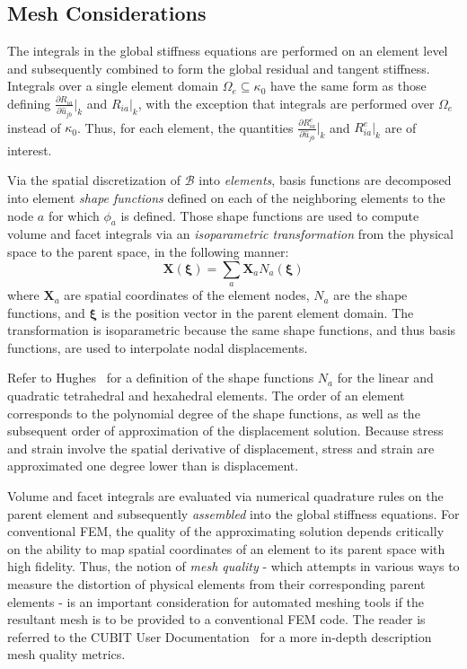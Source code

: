 \subsection{Mesh Considerations}

The integrals in the global stiffness equations are performed on an element level and subsequently combined to form the global residual and tangent stiffness. Integrals over a single element domain $\Omega_e \subseteq \kappa_0$ have the same form as those defining $\frac{\partial R_{ia}}{\partial \hat{u}_{jb}} \big|_k$ and $R_{ia}\big|_k$, with the exception that integrals are performed over $\Omega_e$ instead of $\kappa_0$. Thus, for each element, the quantities $\frac{\partial R^e_{ia}}{\partial \hat{u}_{jb}} \big|_k$ and $R^e_{ia}\big|_k$ are of interest.

Via the spatial discretization of $\mathcal{B}$ into \textit{elements}, basis functions are decomposed into element \textit{shape functions} defined on each of the neighboring elements to the node $a$ for which $\phi_a$ is defined. Those shape functions are used to compute volume and facet integrals via an \textit{isoparametric transformation} from the physical space to the parent space, in the following manner:
\begin{equation}
\bm{X}(\bm{\xi}) = \sum\limits_{a}\bm{X}_a{N}_a(\bm{\xi})
\end{equation}
where $\bm{X}_a$ are spatial coordinates of the element nodes, $N_a$ are the shape functions, and $\bm{\xi}$ is the position vector in the parent element domain. The transformation is isoparametric because the same shape functions, and thus basis functions, are used to interpolate nodal displacements. 

Refer to Hughes~\cite{hughes_2007} for a definition of the shape functions $N_a$ for the linear and quadratic tetrahedral and hexahedral elements. The order of an element corresponds to the polynomial degree of the shape functions, as well as the subsequent order of approximation of the displacement solution. Because stress and strain involve the spatial derivative of displacement, stress and strain are approximated one degree lower than is displacement. 

Volume and facet integrals are evaluated via numerical quadrature rules on the parent element and subsequently \textit{assembled} into the global stiffness equations. For conventional FEM, the quality of the approximating solution depends critically on the ability to map spatial coordinates of an element to its parent space with high fidelity. Thus, the notion of \textit{mesh quality} - which attempts in various ways to measure the distortion of physical elements from their corresponding parent elements - is an important consideration for automated meshing tools if the resultant mesh is to be provided to a conventional FEM code. The reader is referred to the CUBIT User Documentation~\cite{cubit_2018} for a more in-depth description mesh quality metrics.

